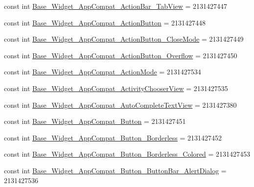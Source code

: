 \begin{DoxyCompactItemize}
\item 
const int \mbox{\hyperlink{class_f_w_p_s___app_1_1_droid_1_1_resource_1_1_style_acee1cfaab7cceff0ac48665da5a99a30}{Base\+\_\+\+Widget\+\_\+\+App\+Compat\+\_\+\+Action\+Bar\+\_\+\+Tab\+View}} = 2131427447
\item 
const int \mbox{\hyperlink{class_f_w_p_s___app_1_1_droid_1_1_resource_1_1_style_ab0827d158f053af2c04752a4bcbf4bf2}{Base\+\_\+\+Widget\+\_\+\+App\+Compat\+\_\+\+Action\+Button}} = 2131427448
\item 
const int \mbox{\hyperlink{class_f_w_p_s___app_1_1_droid_1_1_resource_1_1_style_a08db70ca4a1e1d48e1c649a164a087a7}{Base\+\_\+\+Widget\+\_\+\+App\+Compat\+\_\+\+Action\+Button\+\_\+\+Close\+Mode}} = 2131427449
\item 
const int \mbox{\hyperlink{class_f_w_p_s___app_1_1_droid_1_1_resource_1_1_style_a4ba9c986b8fc407e4bd5e69896654719}{Base\+\_\+\+Widget\+\_\+\+App\+Compat\+\_\+\+Action\+Button\+\_\+\+Overflow}} = 2131427450
\item 
const int \mbox{\hyperlink{class_f_w_p_s___app_1_1_droid_1_1_resource_1_1_style_a70b33eef7663db4f851e47676bbbcc03}{Base\+\_\+\+Widget\+\_\+\+App\+Compat\+\_\+\+Action\+Mode}} = 2131427534
\item 
const int \mbox{\hyperlink{class_f_w_p_s___app_1_1_droid_1_1_resource_1_1_style_acbb64cf21b17b7462018a6ab4eaadbe1}{Base\+\_\+\+Widget\+\_\+\+App\+Compat\+\_\+\+Activity\+Chooser\+View}} = 2131427535
\item 
const int \mbox{\hyperlink{class_f_w_p_s___app_1_1_droid_1_1_resource_1_1_style_ad2ecc7dacaf5625ba330c7dc6e32b4c7}{Base\+\_\+\+Widget\+\_\+\+App\+Compat\+\_\+\+Auto\+Complete\+Text\+View}} = 2131427380
\item 
const int \mbox{\hyperlink{class_f_w_p_s___app_1_1_droid_1_1_resource_1_1_style_a049f11f9f4b58b666ff9de8ccfff7f60}{Base\+\_\+\+Widget\+\_\+\+App\+Compat\+\_\+\+Button}} = 2131427451
\item 
const int \mbox{\hyperlink{class_f_w_p_s___app_1_1_droid_1_1_resource_1_1_style_aa951cd892b0b7728755fd83bcfc50fff}{Base\+\_\+\+Widget\+\_\+\+App\+Compat\+\_\+\+Button\+\_\+\+Borderless}} = 2131427452
\item 
const int \mbox{\hyperlink{class_f_w_p_s___app_1_1_droid_1_1_resource_1_1_style_a4af13982cf709123249d5bf75690d573}{Base\+\_\+\+Widget\+\_\+\+App\+Compat\+\_\+\+Button\+\_\+\+Borderless\+\_\+\+Colored}} = 2131427453
\item 
const int \mbox{\hyperlink{class_f_w_p_s___app_1_1_droid_1_1_resource_1_1_style_a620ce5b23f38761699170ba0c3e34dde}{Base\+\_\+\+Widget\+\_\+\+App\+Compat\+\_\+\+Button\+\_\+\+Button\+Bar\+\_\+\+Alert\+Dialog}} = 2131427536

\end{DoxyCompactItemize}
